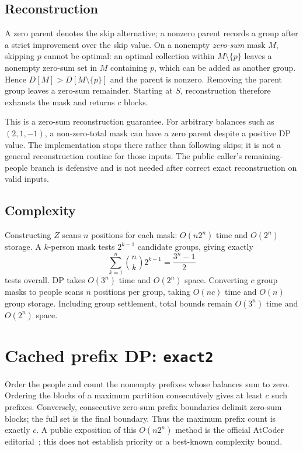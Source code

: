 \documentclass[11pt]{article}
\begin{document}
\subsection{Reconstruction}
A zero parent denotes the skip alternative; a nonzero parent records a
group after a strict improvement over the skip value. On a nonempty
\emph{zero-sum} mask $M$, skipping $p$ cannot be optimal: an optimal
collection within $M\setminus\{p\}$ leaves a nonempty zero-sum set in
$M$ containing $p$, which can be added as another group. Hence
$D[M]>D[M\setminus\{p\}]$ and the parent is nonzero. Removing the parent
group leaves a zero-sum remainder. Starting at $S$, reconstruction
therefore exhausts the mask and returns $c$ blocks.

This is a zero-sum reconstruction guarantee. For arbitrary balances such
as $(2,1,-1)$, a non-zero-total mask can have a zero parent despite a
positive DP value. The implementation stops there rather than following
skips; it is not a general reconstruction routine for those inputs.
The public caller's remaining-people branch is defensive and is not
needed after correct exact reconstruction on valid inputs.

\subsection{Complexity}
Constructing $Z$ scans $n$ positions for each mask: $O(n2^n)$ time and
$O(2^n)$ storage. A $k$-person mask tests $2^{k-1}$ candidate groups,
giving exactly
\[
 \sum_{k=1}^n\binom nk2^{k-1}=\frac{3^n-1}{2}
\]
tests overall. DP takes $O(3^n)$ time and $O(2^n)$ space. Converting
$c$ group masks to people scans $n$ positions per group, taking $O(nc)$
time and $O(n)$ group storage. Including group settlement, total bounds
remain $O(3^n)$ time and $O(2^n)$ space.

\section{Cached prefix DP: \texttt{exact2}}\label{sec:exact2}
Order the people and count the nonempty prefixes whose balances sum to
zero. Ordering the blocks of a maximum partition consecutively gives
at least $c$ such prefixes. Conversely, consecutive zero-sum prefix
boundaries delimit zero-sum blocks; the full set is the final boundary.
Thus the maximum prefix count is exactly $c$. A public exposition of this
$O(n2^n)$ method is the official AtCoder editorial~\cite{atcoder2025};
this does not establish priority or a best-known complexity bound.
\end{document}

